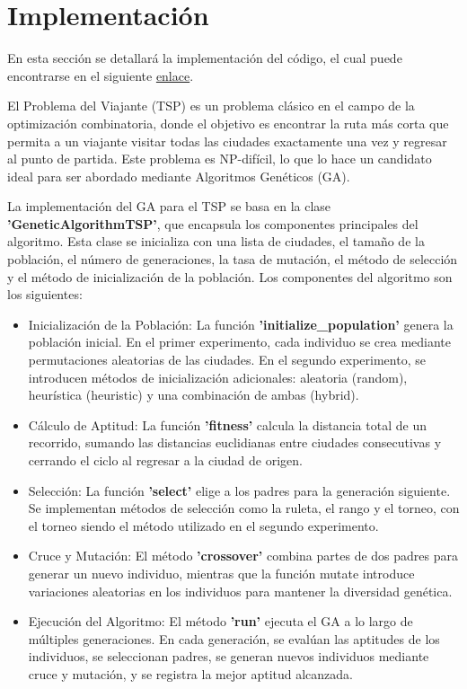 \section{Implementación}

En esta sección se detallará la implementación del código, el cual puede encontrarse en el siguiente \href{https://github.com/rodrigosilupu/TSP-GeneticAlgorithm-Optimization}{enlace}.

El Problema del Viajante (TSP) es un problema clásico en el campo de la optimización combinatoria, donde el objetivo es encontrar la ruta más corta que permita a un viajante visitar todas las ciudades exactamente una vez y regresar al punto de partida. Este problema es NP-difícil, lo que lo hace un candidato ideal para ser abordado mediante Algoritmos Genéticos (GA).

La implementación del GA para el TSP se basa en la clase  \textbf{'GeneticAlgorithmTSP'}, que encapsula los componentes principales del algoritmo. Esta clase se inicializa con una lista de ciudades, el tamaño de la población, el número de generaciones, la tasa de mutación, el método de selección y el método de inicialización de la población. Los componentes del algoritmo son los siguientes:

\begin{itemize}
\item Inicialización de la Población: La función \textbf{'initialize\_population'} genera la población inicial. En el primer experimento, cada individuo se crea mediante permutaciones aleatorias de las ciudades. En el segundo experimento, se introducen métodos de inicialización adicionales: aleatoria (random), heurística (heuristic) y una combinación de ambas (hybrid).
\item Cálculo de Aptitud: La función \textbf{'fitness'} calcula la distancia total de un recorrido, sumando las distancias euclidianas entre ciudades consecutivas y cerrando el ciclo al regresar a la ciudad de origen.
\item Selección: La función \textbf{'select'} elige a los padres para la generación siguiente. Se implementan métodos de selección como la ruleta, el rango y el torneo, con el torneo siendo el método utilizado en el segundo experimento.
\item Cruce y Mutación: El método \textbf{'crossover'} combina partes de dos padres para generar un nuevo individuo, mientras que la función mutate introduce variaciones aleatorias en los individuos para mantener la diversidad genética.
\item Ejecución del Algoritmo: El método \textbf{'run'} ejecuta el GA a lo largo de múltiples generaciones. En cada generación, se evalúan las aptitudes de los individuos, se seleccionan padres, se generan nuevos individuos mediante cruce y mutación, y se registra la mejor aptitud alcanzada.
\end{itemize}
